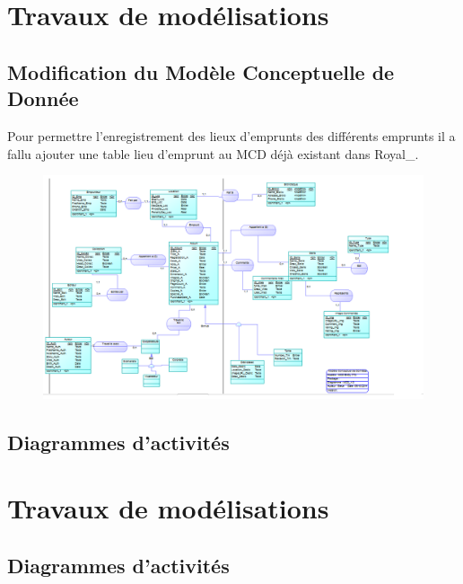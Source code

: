 \section{Travaux de modélisations} 
\subsection{Modification du Modèle Conceptuelle de Donnée}

Pour permettre l'enregistrement des lieux d'emprunts des différents emprunts il a fallu ajouter une table lieu d'emprunt au MCD déjà existant dans Royal\_.
\begin{figure}
\includegraphics[width=12cm]{MCD_Royal_Modif.png}
\end{figure}
\clearpage{}

\subsection{Diagrammes d'activités}

\section{Travaux de modélisations}

\subsection{Diagrammes d'activités}

